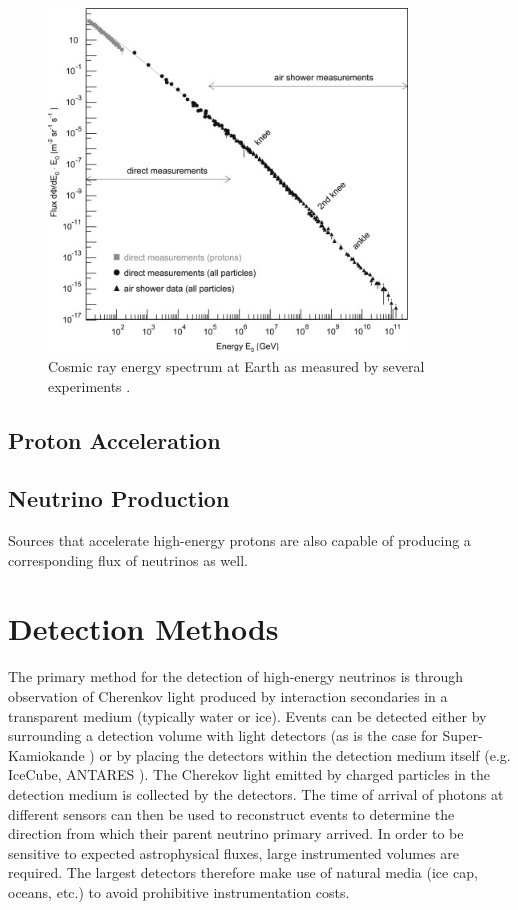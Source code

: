 \documentclass{gatech-thesis}
\begin{document}
\begin{figure}[ht]
  \begin{center}
    \includegraphics[width=0.85\textwidth,keepaspectratio]{CosmicRaySpectrum.jpg}
  \end{center}
  \caption{Cosmic ray energy spectrum at Earth as measured by several experiments \cite{2009PrPNP..63..293B}.}
  \label{fig:cosmicray_spec}
\end{figure}

\subsection{Proton Acceleration}


\subsection{Neutrino Production}
Sources that accelerate high-energy protons are also capable of producing a corresponding flux of neutrinos as well. 

\section{Detection Methods}

The primary method for the detection of high-energy neutrinos is through observation of Cherenkov light produced by interaction secondaries in a transparent medium (typically water or ice). Events can be detected either by surrounding a detection volume with light detectors (as is the case for Super-Kamiokande \cite{?}) or by placing the detectors within the detection medium itself (e.g. IceCube, ANTARES \cite{}). The Cherekov light emitted by charged particles in the detection medium is collected by the detectors. The time of arrival of photons at different sensors can then be used to reconstruct events to determine the direction from  which their parent neutrino primary arrived. In order to be sensitive to expected astrophysical fluxes, large instrumented volumes are required. The largest detectors therefore make use of natural media (ice cap, oceans, etc.) to avoid prohibitive instrumentation costs.
\end{document}
